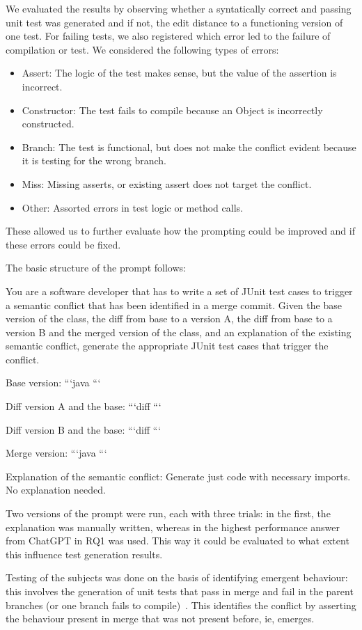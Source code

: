 We evaluated the results by observing whether a syntatically correct and passing unit test was generated and if not, the edit distance to a functioning version of one test. 
For failing tests, we also registered which error led to the failure of compilation or test. 
We considered the following types of errors:
\begin{itemize}
  \item Assert: The logic of the test makes sense, but the value of the assertion is incorrect.
  \item Constructor: The test fails to compile because an Object is incorrectly constructed.
  \item Branch: The test is functional, but does not make the conflict evident because it is testing for the wrong branch.
  \item Miss: Missing asserts, or existing assert does not target the conflict.
  \item Other: Assorted errors in test logic or method calls.
\end{itemize}
These allowed us to further evaluate how the prompting could be improved and if these errors could be fixed.

The basic structure of the prompt follows:
\begin{prompt}
You are a software developer that has to write a set of JUnit test cases to trigger a semantic conflict that has been identified in a merge commit.
Given the base version of the class, the diff from base to a version A, the diff from base to a version B and the merged version of the class, and an explanation of the existing semantic conflict, generate the appropriate JUnit test cases that trigger the conflict.

Base version:
```java
```

Diff version A and the base:
```diff
```

Diff version B and the base:
```diff
```

Merge version:
```java
```

Explanation of the semantic conflict:
Generate just code with necessary imports. No explanation needed.
\end{prompt}
Two versions of the prompt were run, each with three trials: in the first, the explanation was manually written, whereas in the highest performance answer from ChatGPT in RQ1 was used.
This way it could be evaluated to what extent this influence test generation results.

Testing of the subjects was done on the basis of identifying emergent behaviour: this involves the generation of unit tests that
pass in merge and fail in the parent branches (or one branch fails to compile)~\citep{kn:nuno}. This identifies the conflict by
asserting the behaviour present in merge that was not present before, ie, emerges.

